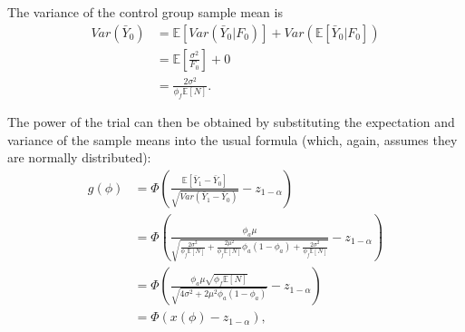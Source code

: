 \documentclass[AMA,STIX1COL]{WileyNJD-v2}
\begin{document}
The variance of the control group sample mean is
\begin{align*}
Var(\bar{Y}_0) &= \mathbb{E}[Var(\bar{Y}_0 | F_0)] + Var(\mathbb{E}[\bar{Y}_0 | F_0]) \\
&= \mathbb{E} \left[ \frac{\sigma^2}{F_0} \right] + 0\\
&= \frac{2\sigma^2}{\phi_f \mathbb{E}[N]}.
\end{align*}

The power of the trial can then be obtained by substituting the expectation and variance of the sample means into the usual formula (which, again, assumes they are normally distributed):
\begin{align*}
g(\phi) &= \Phi \left(\frac{\mathbb{E}[\bar{Y}_1 - \bar{Y}_0]}{\sqrt{Var(\bar{Y}_1 - \bar{Y}_0)}} - z_{1-\alpha} \right) \\
&= \Phi \left( \frac{\phi_a\mu}{\sqrt{ \frac{2\sigma^2}{\phi_f \mathbb{E}[N]} + \frac{2\mu^2}{\phi_f \mathbb{E}[N]} \phi_a (1-\phi_a) + \frac{2\sigma^2}{\phi_f \mathbb{E}[N]}} } - z_{1-\alpha} \right) \\
&= \Phi \left( \frac{ \phi_a\mu \sqrt{\phi_f \mathbb{E}[N]} } {\sqrt{4\sigma^2 + 2\mu^2 \phi_a(1-\phi_a)}} - z_{1-\alpha} \right) \\
&= \Phi \left( x(\phi) - z_{1-\alpha} \right),
\end{align*}
\end{document}
